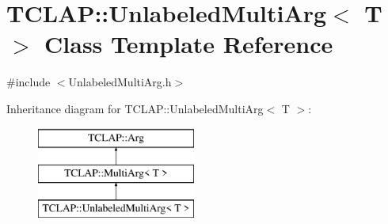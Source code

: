 \hypertarget{class_t_c_l_a_p_1_1_unlabeled_multi_arg}{}\section{T\+C\+L\+A\+P\+:\+:Unlabeled\+Multi\+Arg$<$ T $>$ Class Template Reference}
\label{class_t_c_l_a_p_1_1_unlabeled_multi_arg}


{\ttfamily \#include $<$Unlabeled\+Multi\+Arg.\+h$>$}

Inheritance diagram for T\+C\+L\+A\+P\+:\+:Unlabeled\+Multi\+Arg$<$ T $>$\+:\begin{figure}[H]
\begin{center}
\leavevmode
\includegraphics[height=3.000000cm]{class_t_c_l_a_p_1_1_unlabeled_multi_arg}
\end{center}
\end{figure}
